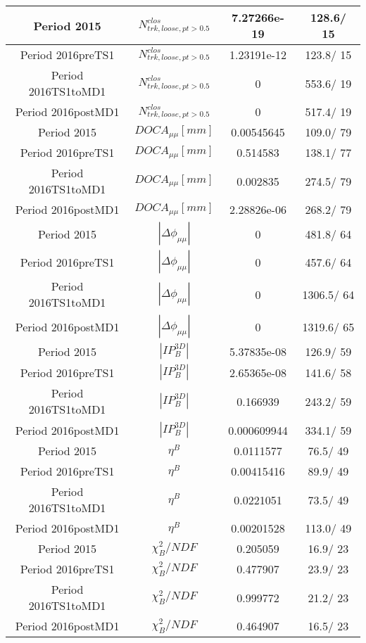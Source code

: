 \documentclass{article}
\begin{document}
\begin{longtable}{c|c|c|c}
\hline
 Period 2015 & $N^{clos}_{trk, loose, pt>0.5}$ & 7.27266e-19 & 128.6/ 15\\
\hline
 Period 2016preTS1 & $N^{clos}_{trk, loose, pt>0.5}$ & 1.23191e-12 & 123.8/ 15\\
\hline
 Period 2016TS1toMD1 & $N^{clos}_{trk, loose, pt>0.5}$ & 0 & 553.6/ 19\\
\hline
 Period 2016postMD1 & $N^{clos}_{trk, loose, pt>0.5}$ & 0 & 517.4/ 19\\
\hline
 Period 2015 & $DOCA_{\mu\mu} [mm]$ & 0.00545645 & 109.0/ 79\\
\hline
 Period 2016preTS1 & $DOCA_{\mu\mu} [mm]$ & 0.514583 & 138.1/ 77\\
\hline
 Period 2016TS1toMD1 & $DOCA_{\mu\mu} [mm]$ & 0.002835 & 274.5/ 79\\
\hline
 Period 2016postMD1 & $DOCA_{\mu\mu} [mm]$ & 2.28826e-06 & 268.2/ 79\\
\hline
 Period 2015 & $|\Delta\phi_{\mu\mu}|$ & 0 & 481.8/ 64\\
\hline
 Period 2016preTS1 & $|\Delta\phi_{\mu\mu}|$ & 0 & 457.6/ 64\\
\hline
 Period 2016TS1toMD1 & $|\Delta\phi_{\mu\mu}|$ & 0 & 1306.5/ 64\\
\hline
 Period 2016postMD1 & $|\Delta\phi_{\mu\mu}|$ & 0 & 1319.6/ 65\\
\hline
 Period 2015 & $|IP_{B}^{3D}|$ & 5.37835e-08 & 126.9/ 59\\
\hline
 Period 2016preTS1 & $|IP_{B}^{3D}|$ & 2.65365e-08 & 141.6/ 58\\
\hline
 Period 2016TS1toMD1 & $|IP_{B}^{3D}|$ & 0.166939 & 243.2/ 59\\
\hline
 Period 2016postMD1 & $|IP_{B}^{3D}|$ & 0.000609944 & 334.1/ 59\\
\hline
 Period 2015 & $\eta^{B}$ & 0.0111577 &  76.5/ 49\\
\hline
 Period 2016preTS1 & $\eta^{B}$ & 0.00415416 &  89.9/ 49\\
\hline
 Period 2016TS1toMD1 & $\eta^{B}$ & 0.0221051 &  73.5/ 49\\
\hline
 Period 2016postMD1 & $\eta^{B}$ & 0.00201528 & 113.0/ 49\\
\hline
 Period 2015 & $\chi^{2}_{B}/NDF$ & 0.205059 &  16.9/ 23\\
\hline
 Period 2016preTS1 & $\chi^{2}_{B}/NDF$ & 0.477907 &  23.9/ 23\\
\hline
 Period 2016TS1toMD1 & $\chi^{2}_{B}/NDF$ & 0.999772 &  21.2/ 23\\
\hline
 Period 2016postMD1 & $\chi^{2}_{B}/NDF$ & 0.464907 &  16.5/ 23\\

\end{longtable}
\end{document}
